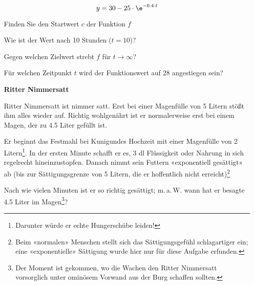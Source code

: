 $$y=30-25\cdot{}\e^{-0.4\cdot{}t}$$

\begin{bbwAufgabenBlock}
\item Finden Sie den Startwert $c$ der Funktion $f$

\item Wie ist der Wert nach 10 Stunden ($t=10$)?

\item Gegen welchen Zielwert strebt $f$ für  $t\rightarrow\infty$?

\item Für welchen Zeitpunkt $t$ wird der Funktionswert auf 28
  angestiegen sein?
  
\end{bbwAufgabenBlock}  

\platzFuerBerechnungenBisEndeSeite{}



\bbwActAufgabenNr{} \textbf{Ritter Nimmersatt}

\nextBbwAufgabenNummer{}

Ritter Nimmersatt ist nimmer satt. Erst bei einer Magenfülle von
5 Litern stößt ihm alles wieder auf. Richtig wohlgenährt ist er
normalerweise erst bei einem Magen, der zu 4.5 Liter gefüllt ist.

Er beginnt das Festmahl bei Kunigundes Hochzeit mit einer Magenfülle
von 2 Litern\footnote{Darunter würde er echte Hungerschübe
  leiden!}. In der ersten Minute schafft er es, 3 dl Flüssigkeit oder Nahrung
in sich regelrecht hineinzustopfen. Danach nimmt sein Futtern
«exponentiell gesättigt» ab (bis zur Sättigungsgrenze von 5 Litern, die er
hoffentlich nicht erreicht)\footnote{Beim «normalen» Menschen stellt
  sich das Sättigungsgefühl schlagartiger ein; eine «exponentielle»
  Sättigung wurde hier nur für diese Aufgabe erfunden.}%

Nach wie vielen Minuten ist er so richtig gesättigt; m.\,a.\,W. wann
hat er besagte 4.5 Liter im Magen\footnote{Der Moment ist gekommen, wo
  die Wachen den Ritter Nimmersatt vorsorglich unter ominösem Vorwand aus der Burg schaffen sollten.}?

\newpage


